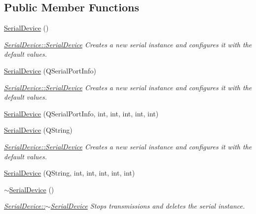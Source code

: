 \subsection*{Public Member Functions}
\begin{DoxyCompactItemize}
\item 
\hyperlink{class_serial_device_aad126bede3b0adf49e1fbe3afd7c6c42}{Serial\+Device} ()
\begin{DoxyCompactList}\small\item\em \hyperlink{class_serial_device_aad126bede3b0adf49e1fbe3afd7c6c42}{Serial\+Device\+::\+Serial\+Device} Creates a new serial instance and configures it with the default values. \end{DoxyCompactList}\item 
\hyperlink{class_serial_device_aa0b6d87aea8d882096abe85fda113b26}{Serial\+Device} (Q\+Serial\+Port\+Info)
\begin{DoxyCompactList}\small\item\em \hyperlink{class_serial_device_aad126bede3b0adf49e1fbe3afd7c6c42}{Serial\+Device\+::\+Serial\+Device} Creates a new serial instance and configures it with the default values. \end{DoxyCompactList}\item 
\hyperlink{class_serial_device_acd6d42b1547bef45569e20ba75cd024a}{Serial\+Device} (Q\+Serial\+Port\+Info, int, int, int, int, int)
\item 
\hyperlink{class_serial_device_a070f0759c102570004f1c5e1feb31abe}{Serial\+Device} (Q\+String)
\begin{DoxyCompactList}\small\item\em \hyperlink{class_serial_device_aad126bede3b0adf49e1fbe3afd7c6c42}{Serial\+Device\+::\+Serial\+Device} Creates a new serial instance and configures it with the default values. \end{DoxyCompactList}\item 
\hyperlink{class_serial_device_ade7e1d81fe4768ca9f04b12513d7e316}{Serial\+Device} (Q\+String, int, int, int, int, int)
\item 
\hyperlink{class_serial_device_abd30865bc9e855e8be713f666d6b4244}{$\sim$\+Serial\+Device} ()
\begin{DoxyCompactList}\small\item\em \hyperlink{class_serial_device_abd30865bc9e855e8be713f666d6b4244}{Serial\+Device\+::$\sim$\+Serial\+Device} Stops transmissions and deletes the serial instance. \end{DoxyCompactList}\item 

\end{DoxyCompactItemize}
